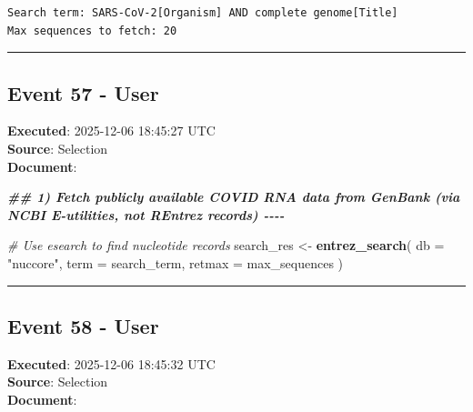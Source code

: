 \documentclass[
  11pt,
]{article}
\newenvironment{Shaded}{\begin{snugshade}}{\end{snugshade}}
\newcommand{\AttributeTok}[1]{\textcolor[rgb]{0.13,0.29,0.53}{#1}}
\newcommand{\CommentTok}[1]{\textcolor[rgb]{0.56,0.35,0.01}{\textit{#1}}}
\newcommand{\DocumentationTok}[1]{\textcolor[rgb]{0.56,0.35,0.01}{\textbf{\textit{#1}}}}
\newcommand{\FunctionTok}[1]{\textcolor[rgb]{0.13,0.29,0.53}{\textbf{#1}}}
\newcommand{\NormalTok}[1]{#1}
\newcommand{\OtherTok}[1]{\textcolor[rgb]{0.56,0.35,0.01}{#1}}
\newcommand{\StringTok}[1]{\textcolor[rgb]{0.31,0.60,0.02}{#1}}
\newenvironment{rpoutput}{\vspace{0.5em}\begin{snugshade}}{\end{snugshade}}
\begin{document}
\begin{rpoutput}

\begin{verbatim}
Search term: SARS-CoV-2[Organism] AND complete genome[Title] 
Max sequences to fetch: 20 
\end{verbatim}

\end{rpoutput}

\begin{center}\rule{0.5\linewidth}{0.5pt}\end{center}

\subsection{Event 57 - User}\label{event-57---user}

\textbf{Executed}: 2025-12-06 18:45:27 UTC\\
\textbf{Source}: Selection\\
\textbf{Document}:

\begin{Shaded}
\begin{Highlighting}[]
\DocumentationTok{\#\# 1) Fetch publicly available COVID RNA data from GenBank (via NCBI E{-}utilities, not REntrez records) {-}{-}{-}{-}}

\CommentTok{\# Use esearch to find nucleotide records}
\NormalTok{search\_res }\OtherTok{\textless{}{-}} \FunctionTok{entrez\_search}\NormalTok{(}
  \AttributeTok{db =} \StringTok{"nuccore"}\NormalTok{,}
  \AttributeTok{term =}\NormalTok{ search\_term,}
  \AttributeTok{retmax =}\NormalTok{ max\_sequences}
\NormalTok{)}
\end{Highlighting}
\end{Shaded}

\begin{center}\rule{0.5\linewidth}{0.5pt}\end{center}

\subsection{Event 58 - User}\label{event-58---user}

\textbf{Executed}: 2025-12-06 18:45:32 UTC\\
\textbf{Source}: Selection\\
\textbf{Document}:
\end{document}
